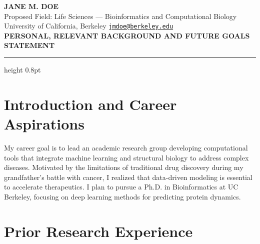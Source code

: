 \documentclass[11pt,letterpaper]{article}
\begin{document}
\color{darkgray}


\begin{center}
    {\fontsize{12pt}{14pt}\selectfont \textbf{\textcolor{accent}{JANE M. DOE}}} \\
    \vspace{2pt}
    {\fontsize{9.5pt}{11pt}\selectfont Proposed Field: Life Sciences --- Bioinformatics and Computational Biology} \\
    {\fontsize{9.5pt}{11pt}\selectfont University of California, Berkeley \quad \textbullet \quad \href{mailto:jmdoe@berkeley.edu}{\texttt{jmdoe@berkeley.edu}}} \\
    \vspace{4pt}
    {\fontsize{10.5pt}{12pt}\selectfont \textbf{PERSONAL, RELEVANT BACKGROUND AND FUTURE GOALS STATEMENT}}
\end{center}
\vspace{-8pt}
\textcolor{accent}{\hrule height 0.8pt}
\vspace{6pt}

\section{Introduction and Career Aspirations}
My career goal is to lead an academic research group developing computational tools that integrate machine learning and structural biology to address complex diseases. Motivated by the limitations of traditional drug discovery during my grandfather's battle with cancer, I realized that data-driven modeling is essential to accelerate therapeutics. I plan to pursue a Ph.D. in Bioinformatics at UC Berkeley, focusing on deep learning methods for predicting protein dynamics.

\section{Prior Research Experience}
\end{document}
